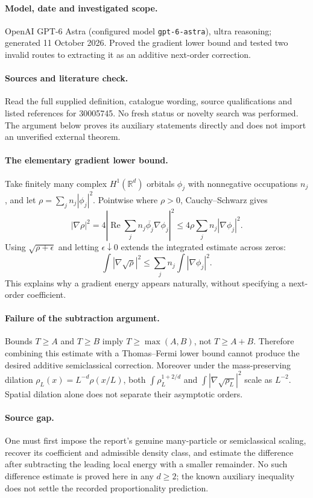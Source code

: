 \documentclass[11pt]{article}
\begin{document}
\paragraph{Model, date and investigated scope.}
OpenAI GPT-6 Astra (configured model \texttt{gpt-6-astra}), ultra reasoning; generated 11 October 2026. Proved the gradient lower bound and tested two invalid routes to extracting it as an additive next-order correction.

\paragraph{Sources and literature check.}
Read the full supplied definition, catalogue wording, source qualifications and listed references for 30005745. No fresh status or novelty search was performed. The argument below proves its auxiliary statements directly and does not import an unverified external theorem.

\paragraph{The elementary gradient lower bound.} Take finitely many complex \(H^1(\mathbb R^d)\) orbitals \(\phi_j\) with nonnegative occupations \(n_j\), and let \(\rho=\sum_j n_j|\phi_j|^2\). Pointwise where \(\rho>0\), Cauchy--Schwarz gives
\[
 |\nabla\rho|^2
 =4\left|\operatorname{Re}\sum_j n_j\overline{\phi_j}\nabla\phi_j\right|^2
 \leq4\rho\sum_jn_j|\nabla\phi_j|^2.
\]
Using \(\sqrt{\rho+\epsilon}\) and letting \(\epsilon\downarrow0\) extends the integrated estimate across zeros:
\[
 \int|\nabla\sqrt\rho|^2\leq\sum_jn_j\int|\nabla\phi_j|^2.
\]
This explains why a gradient energy appears naturally, without specifying a next-order coefficient.
\paragraph{Failure of the subtraction argument.} Bounds \(T\geq A\) and \(T\geq B\) imply \(T\geq\max(A,B)\), not \(T\geq A+B\). Therefore combining this estimate with a Thomas--Fermi lower bound cannot produce the desired additive semiclassical correction. Moreover under the mass-preserving dilation \(\rho_L(x)=L^{-d}\rho(x/L)\), both \(\int\rho_L^{1+2/d}\) and \(\int|\nabla\sqrt{\rho_L}|^2\) scale as \(L^{-2}\). Spatial dilation alone does not separate their asymptotic orders.
\paragraph{Source gap.} One must first impose the report's genuine many-particle or semiclassical scaling, recover its coefficient and admissible density class, and estimate the difference after subtracting the leading local energy with a smaller remainder. No such difference estimate is proved here in any \(d\geq2\); the known auxiliary inequality does not settle the recorded proportionality prediction.
\end{document}
